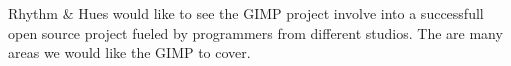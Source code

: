 
Rhythm \& Hues would like to see the GIMP project involve into a
successfull open source project fueled by programmers from different
studios. The are many areas we would like the GIMP to cover.

